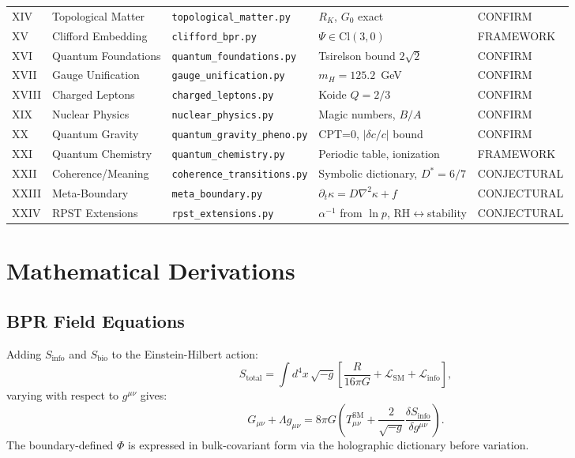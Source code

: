 \documentclass[12pt,oneside]{book}
\theoremstyle{definition}
\begin{document}
\begin{longtable}{@{}llp{3.2cm}p{5.5cm}l@{}}
  XIV & Topological Matter   & \texttt{topological\_matter.py}& $R_K$, $G_0$ exact             & CONFIRM\\
  XV  & Clifford Embedding   & \texttt{clifford\_bpr.py}   & $\Psi\in\mathrm{Cl}(3,0)$          & FRAMEWORK\\
  XVI & Quantum Foundations  & \texttt{quantum\_foundations.py}& Tsirelson bound $2\sqrt{2}$   & CONFIRM\\
  XVII& Gauge Unification    & \texttt{gauge\_unification.py}& $m_H = 125.2$~GeV              & CONFIRM\\
  XVIII& Charged Leptons     & \texttt{charged\_leptons.py}& Koide $Q=2/3$                       & CONFIRM\\
  XIX & Nuclear Physics      & \texttt{nuclear\_physics.py}& Magic numbers, $B/A$               & CONFIRM\\
  XX  & Quantum Gravity      & \texttt{quantum\_gravity\_pheno.py}& CPT=0, $|\delta c/c|$ bound & CONFIRM\\
  XXI & Quantum Chemistry    & \texttt{quantum\_chemistry.py}& Periodic table, ionization       & FRAMEWORK\\
  XXII& Coherence/Meaning    & \texttt{coherence\_transitions.py}& Symbolic dictionary, $D^*=6/7$ & CONJECTURAL\\
  XXIII& Meta-Boundary       & \texttt{meta\_boundary.py}  & $\partial_t\kappa = D\nabla^2\kappa + f$ & CONJECTURAL\\
  XXIV& RPST Extensions      & \texttt{rpst\_extensions.py}& $\alpha^{-1}$ from $\ln p$, RH$\leftrightarrow$stability & CONJECTURAL\\
  \bottomrule
\end{longtable}

\chapter{Mathematical Derivations}
\label{app:derivations}

\section{BPR Field Equations}

Adding $S_{\mathrm{info}}$ and $S_{\mathrm{bio}}$ to the Einstein-Hilbert action:
\begin{equation}
  S_{\mathrm{total}} = \int d^4x\,\sqrt{-g}\!\left[
    \frac{R}{16\pi G} + \mathcal{L}_{\mathrm{SM}} + \mathcal{L}_{\mathrm{info}}
  \right],
\end{equation}
varying with respect to $g^{\mu\nu}$ gives:
\begin{equation}
  G_{\mu\nu} + \Lambda g_{\mu\nu}
  = 8\pi G\!\left(T^{\mathrm{SM}}_{\mu\nu}
    + \frac{2}{\sqrt{-g}}\frac{\delta S_{\mathrm{info}}}{\delta g^{\mu\nu}}\right).
\end{equation}
The boundary-defined $\Phi$ is expressed in bulk-covariant form via the holographic
dictionary before variation.
\end{document}
